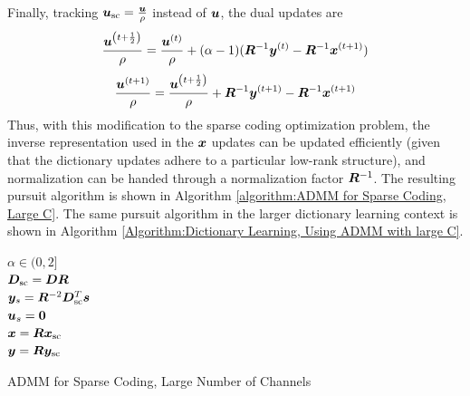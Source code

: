 %
Finally, tracking $\bm{u}_{\text{sc}} = \frac{\bm{u}}{\rho}$ instead of $\bm{u}$, the dual updates are 
\begin{equation}
\frac{\bm{u}^{\left(t + \frac{1}{2}\right)}}{\rho} = \frac{\bm{u}^{(t)}}{\rho} + (\alpha - 1)(\bm{R}^{-1}\bm{y}^{(t)} - \bm{R}^{-1}\bm{x}^{(t + 1)})
\end{equation}
%
\begin{equation}
\frac{\bm{u}^{(t + 1)}}{\rho} = \frac{\bm{u}^{\left(t + \frac{1}{2}\right)}}{\rho} + \bm{R}^{-1}\bm{y}^{(t + 1)} - \bm{R}^{-1}\bm{x}^{(t + 1)}
\end{equation}
%
Thus, with this modification to the sparse coding optimization problem, the inverse representation used in the $\bm{x}$ updates can be updated efficiently (given that the dictionary updates adhere to a particular low-rank structure), and normalization can be handed through a normalization factor $\bm{R}^{-1}$. The resulting pursuit algorithm is shown in Algorithm \ref{algorithm:ADMM for Sparse Coding, Large C}. The same pursuit algorithm in the larger dictionary learning context is shown in Algorithm \ref{Algorithm:Dictionary Learning, Using ADMM with large C}.


\begin{algorithm}[h]
\SetAlgoLined 
   $\alpha \in (0,2]$ \\
   $\bm{D}_{\text{sc}} = \bm{D}\bm{R}$  \\
   $\bm{y}_s = \bm{R}^{-2}\bm{D}_{\text{sc}}^T\bm{s}$ \\
   $\bm{u}_s = \bm{0}$ \\
  $\bm{x} = \bm{R}\bm{x}_{\text{sc}}$ \\
  $\bm{y} = \bm{R}\bm{y}_{\text{sc}}$
 \caption{ADMM for Sparse Coding, Large Number of Channels}\label{algorithm:ADMM for Sparse Coding, Large C}
\end{algorithm}

